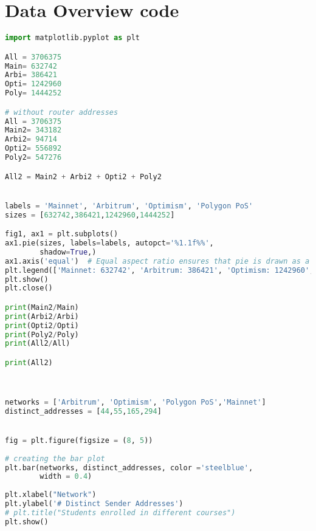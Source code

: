 \newpage
\chapter{Data Overview code}
\label{APP:data}

\begin{lstlisting}[language=python]
import matplotlib.pyplot as plt

All = 3706375
Main= 632742
Arbi= 386421
Opti= 1242960
Poly= 1444252

# without router addresses
All = 3706375
Main2= 343182
Arbi2= 94714
Opti2= 556892
Poly2= 547276

All2 = Main2 + Arbi2 + Opti2 + Poly2


labels = 'Mainnet', 'Arbitrum', 'Optimism', 'Polygon PoS'
sizes = [632742,386421,1242960,1444252]

fig1, ax1 = plt.subplots()
ax1.pie(sizes, labels=labels, autopct='%1.1f%%',
        shadow=True,)
ax1.axis('equal')  # Equal aspect ratio ensures that pie is drawn as a circle.
plt.legend(['Mainnet: 632742', 'Arbitrum: 386421', 'Optimism: 1242960', 'Polygon Pos: 1444252', 'Total: '])
plt.show()
plt.close()

print(Main2/Main)
print(Arbi2/Arbi)
print(Opti2/Opti)
print(Poly2/Poly)
print(All2/All)

print(All2)



networks = ['Arbitrum', 'Optimism', 'Polygon PoS','Mainnet']
distinct_addresses = [44,55,165,294]


fig = plt.figure(figsize = (8, 5))
 
# creating the bar plot
plt.bar(networks, distinct_addresses, color ='steelblue',
        width = 0.4)
 
plt.xlabel("Network")
plt.ylabel('# Distinct Sender Addresses')
# plt.title("Students enrolled in different courses")
plt.show()
\end{lstlisting}
